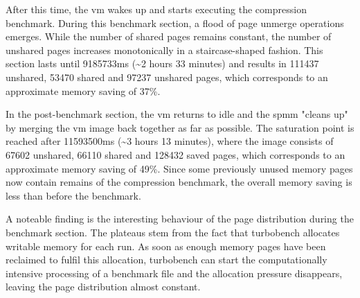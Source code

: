 After this time, the \ac{vm} wakes up and starts executing the compression benchmark.
During this benchmark section, a flood of page unmerge operations emerges.
While the number of shared pages remains constant, the number of unshared pages increases monotonically in a staircase-shaped fashion.
This section lasts until 9185733ms (\textasciitilde{}2 hours 33 minutes) and results in 111437 unshared, 53470 shared and 97237 unshared pages, which corresponds to an approximate memory saving of 37\%.

In the post-benchmark section, the \ac{vm} returns to idle and the \ac{spmm} "cleans up" by merging the \ac{vm} image back together as far as possible.
The saturation point is reached after 11593500ms (\textasciitilde{}3 hours 13 minutes), where the image consists of 67602 unshared, 66110 shared and 128432 saved pages, which corresponds to an approximate memory saving of 49\%.
Since some previously unused memory pages now contain remains of the compression benchmark, the overall memory saving is less than before the benchmark.

A noteable finding is the interesting behaviour of the page distribution during the benchmark section.
The plateaus stem from the fact that turbobench allocates writable memory for each run.
As soon as enough memory pages have been reclaimed to fulfil this allocation, turbobench can start the computationally intensive processing of a benchmark file and the allocation pressure disappears, leaving the page distribution almost constant.

